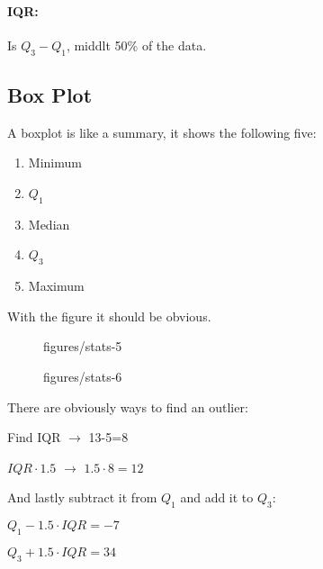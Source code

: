 \paragraph{IQR:} Is $Q_3 -Q_1$, middlt 50\% of the data.

\subsection{Box Plot}

A boxplot is like a summary, it shows the following five:
\begin{enumerate}
    \item Minimum
    \item $Q_1$
    \item Median
    \item $Q_3$
    \item Maximum
\end{enumerate}
With the figure it should be obvious.

\begin{figure}[ht]
    \centering
    \caption{figures/stats-5}
    \label{fig:stats-5}
\end{figure}

\begin{figure}[ht]
    \centering
    \caption{figures/stats-6}
    \label{fig:stats-6}
\end{figure}

\vspace{50pt}

There are obviously ways to find an outlier:

Find IQR $\to$ 13-5=8

$IQR \cdot 1.5$ $\to $ $1.5\cdot 8=12$

And lastly subtract it from $Q_1$ and add it to $Q_3$:

$Q_1 - 1.5\cdot IQR = -7$

$Q_3 + 1.5\cdot IQR = 34$

